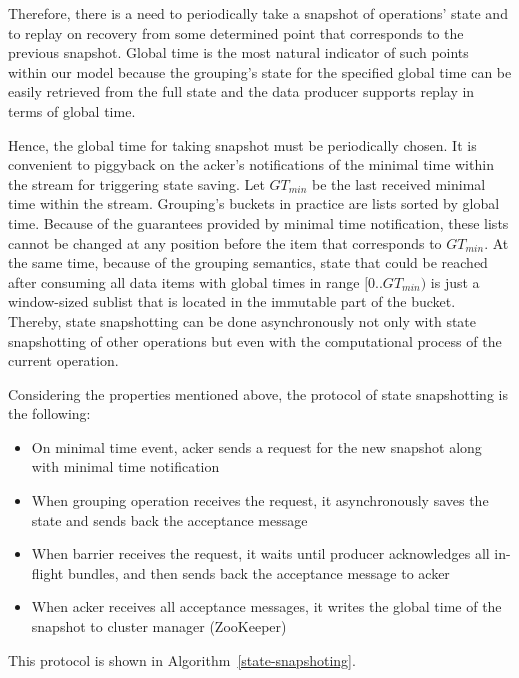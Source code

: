 Therefore, there is a need to periodically take a snapshot of operations' state and to replay on recovery from some determined point that corresponds to the previous snapshot. Global time is the most natural indicator of such points within our model because the grouping's state for the specified global time can be easily retrieved from the full state and the data producer supports replay in terms of global time.   

Hence, the global time for taking snapshot must be periodically chosen. It is convenient to piggyback on the acker's notifications of the minimal time within the stream for triggering state saving. Let $GT_{min}$ be the last received minimal time within the stream. Grouping's buckets in practice are lists sorted by global time. Because of the guarantees provided by minimal time notification, these lists cannot be changed at any position before the item that corresponds to $GT_{min}$. At the same time, because of the grouping semantics, state that could be reached after consuming all data items with global times in range $[0..GT_{min})$ is just a window-sized sublist that is located in the immutable part of the bucket. Thereby, state snapshotting can be done asynchronously not only with state snapshotting of other operations but even with the computational process of the current operation. 

Considering the properties mentioned above, the protocol of state snapshotting is the following:

\begin{itemize}
    \item On minimal time event, acker sends a request for the new snapshot along with minimal time notification
    \item When grouping operation receives the request, it asynchronously saves the state and sends back the acceptance message   
    \item When barrier receives the request, it waits until producer acknowledges all in-flight bundles, and then sends back the acceptance message to acker
    \item When acker receives all acceptance messages, it writes the global time of the snapshot to cluster manager (ZooKeeper) 
\end{itemize}

This protocol is shown in Algorithm~\ref{state-snapshoting}.

